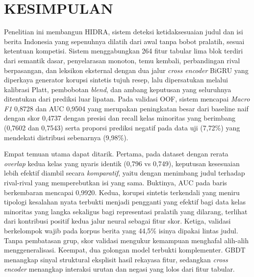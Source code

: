 \section{KESIMPULAN}

Penelitian ini membangun HIDRA, sistem deteksi ketidaksesuaian judul dan isi berita Indonesia yang sepenuhnya dilatih dari awal tanpa bobot pralatih, sesuai ketentuan kompetisi. Sistem menggabungkan 264 fitur tabular lima blok terdiri dari semantik dasar, penyelarasan monoton, temu kembali, perbandingan rival berpasangan, dan leksikon eksternal dengan dua jalur \textit{cross encoder} BiGRU yang diperkaya generator korupsi sintetis tujuh resep, lalu dipersatukan melalui kalibrasi Platt, pembobotan \textit{blend}, dan ambang keputusan yang seluruhnya ditentukan dari prediksi luar lipatan. Pada validasi OOF, sistem mencapai \textit{Macro F1} 0{,}8728 dan AUC 0{,}9504 yang merupakan peningkatan besar dari baseline naif dengan skor 0{,}4737 dengan presisi dan recall kelas minoritas yang berimbang (0{,}7602 dan 0{,}7543) serta proporsi prediksi negatif pada data uji (7{,}72\%) yang mendekati distribusi sebenarnya (9{,}98\%).

Empat temuan utama dapat ditarik. Pertama, pada dataset dengan rerata \textit{overlap} kedua kelas yang nyaris identik (0,796 vs 0,749), keputusan kesesuaian lebih efektif diambil secara \textit{komparatif}, yaitu dengan menimbang judul terhadap rival-rival yang memperebutkan isi yang sama. Buktinya, AUC pada baris berkembaran mencapai 0{,}9920. Kedua, korupsi sintetis terkendali yang meniru tipologi kesalahan nyata terbukti menjadi pengganti yang efektif bagi data kelas minoritas yang langka sekaligus bagi representasi pralatih yang dilarang, terlihat dari kontribusi positif kedua jalur neural sebagai fitur skor. Ketiga, validasi berkelompok wajib pada korpus berita yang 44{,}5\% isinya dipakai lintas judul. Tanpa pembatasan grup, skor validasi mengukur kemampuan menghafal alih-alih menggeneralisasi. Keempat, dua golongan model terbukti komplementer. GBDT menangkap sinyal struktural eksplisit hasil rekayasa fitur, sedangkan \textit{cross encoder} menangkap interaksi urutan dan negasi yang lolos dari fitur tabular.

